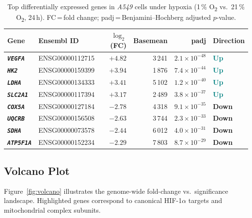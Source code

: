 \documentclass[11pt, a4paper]{article}
\newcommand{\gene}[1]{\texttt{\textit{#1}}}
\begin{document}
\setlength{\parskip}{0pt}
\begin{table}[h]
\centering
\caption{Top differentially expressed genes in \textit{A549} cells under hypoxia
(1\,\% O\textsubscript{2} vs.\ 21\,\% O\textsubscript{2}, 24\,h).
FC\,=\,fold change; padj\,=\,Benjamini--Hochberg adjusted $p$-value.}
\label{tab:degs}
\small
\begin{tabularx}{\linewidth}{@{}>{\bfseries}l l r r r l@{}}
\toprule
Gene & Ensembl ID & $\log_2$(FC) & Basemean & padj & Direction \\
\midrule
\gene{VEGFA}   & ENSG00000112715 & $+4.82$ & 3\,241 & $2.1\!\times\!10^{-48}$ & \textcolor{teal}{\bfseries Up} \\
\gene{HK2}     & ENSG00000159399 & $+3.94$ & 1\,876 & $7.4\!\times\!10^{-44}$ & \textcolor{teal}{\bfseries Up} \\
\gene{LDHA}    & ENSG00000134333 & $+3.41$ & 5\,102 & $1.2\!\times\!10^{-40}$ & \textcolor{teal}{\bfseries Up} \\
\gene{SLC2A1}  & ENSG00000117394 & $+3.17$ & 2\,489 & $3.8\!\times\!10^{-37}$ & \textcolor{teal}{\bfseries Up} \\
\gene{COX5A}   & ENSG00000127184 & $-2.78$ & 4\,318 & $9.1\!\times\!10^{-35}$ & \textcolor{midgrey}{\bfseries Down} \\
\gene{UQCRB}   & ENSG00000156508 & $-2.63$ & 3\,744 & $2.3\!\times\!10^{-33}$ & \textcolor{midgrey}{\bfseries Down} \\
\gene{SDHA}    & ENSG00000073578 & $-2.44$ & 6\,012 & $4.0\!\times\!10^{-31}$ & \textcolor{midgrey}{\bfseries Down} \\
\gene{ATP5F1A} & ENSG00000152234 & $-2.29$ & 7\,803 & $8.7\!\times\!10^{-29}$ & \textcolor{midgrey}{\bfseries Down} \\
\bottomrule
\end{tabularx}
\end{table}
\setlength{\parskip}{5pt}

\subsection{Volcano Plot}

Figure~\ref{fig:volcano} illustrates the genome-wide fold-change vs.\ significance
landscape. Highlighted genes correspond to canonical HIF-1$\alpha$ targets and
mitochondrial complex subunits.
\end{document}
